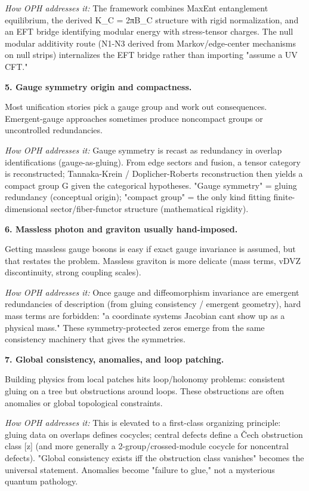 \emph{How OPH addresses it:} The framework combines MaxEnt entanglement equilibrium, the derived K\_C = 2πB\_C structure with rigid normalization, and an EFT bridge identifying modular energy with stress-tensor charges. The null modular additivity route (N1-N3 derived from Markov/edge-center mechanisms on null strips) internalizes the EFT bridge rather than importing "assume a UV CFT."

\textbf{5. Gauge symmetry origin and compactness.}

Most unification stories pick a gauge group and work out consequences. Emergent-gauge approaches sometimes produce noncompact groups or uncontrolled redundancies.

\emph{How OPH addresses it:} Gauge symmetry is recast as redundancy in overlap identifications (gauge-as-gluing). From edge sectors and fusion, a tensor category is reconstructed; Tannaka-Krein / Doplicher-Roberts reconstruction then yields a compact group G given the categorical hypotheses. "Gauge symmetry" = gluing redundancy (conceptual origin); "compact group" = the only kind fitting finite-dimensional sector/fiber-functor structure (mathematical rigidity).

\textbf{6. Massless photon and graviton usually hand-imposed.}

Getting massless gauge bosons is easy if exact gauge invariance is assumed, but that restates the problem. Massless graviton is more delicate (mass terms, vDVZ discontinuity, strong coupling scales).

\emph{How OPH addresses it:} Once gauge and diffeomorphism invariance are emergent redundancies of description (from gluing consistency / emergent geometry), hard mass terms are forbidden: "a coordinate system\textquotesingle s Jacobian can\textquotesingle t show up as a physical mass." These symmetry-protected zeros emerge from the same consistency machinery that gives the symmetries.

\textbf{7. Global consistency, anomalies, and loop patching.}

Building physics from local patches hits loop/holonomy problems: consistent gluing on a tree but obstructions around loops. These obstructions are often anomalies or global topological constraints.

\emph{How OPH addresses it:} This is elevated to a first-class organizing principle: gluing data on overlaps defines cocycles; central defects define a \v{C}ech obstruction class {[}z{]} (and more generally a 2-group/crossed-module cocycle for noncentral defects). "Global consistency exists iff the obstruction class vanishes" becomes the universal statement. Anomalies become "failure to glue," not a mysterious quantum pathology.

